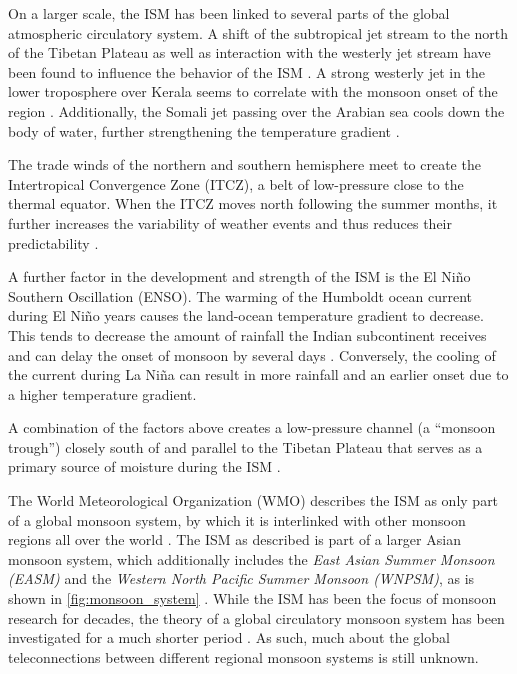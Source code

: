 On a larger scale, the ISM has been linked to several parts of the global atmospheric circulatory system. A shift of the subtropical jet stream to the north of the Tibetan Plateau as well as interaction with the westerly jet stream have been found to influence the behavior of the ISM \citep{Ordonez.2016, Stolbova.2015}. A strong westerly jet in the lower troposphere over Kerala seems to correlate with the monsoon onset of the region \citep{Ordonez.2016}. Additionally, the Somali jet passing over the Arabian sea cools down the body of water, further strengthening the temperature gradient \citep{Stolbova.2015}.

The trade winds of the northern and southern hemisphere meet to create the Intertropical Convergence Zone (ITCZ), a belt of low-pressure close to the thermal equator. When the ITCZ moves north following the summer months, it further increases the variability of weather events and thus reduces their predictability \citep{Stolbova.2015}.

A further factor in the development and strength of the ISM is the El Niño Southern Oscillation (ENSO). The warming of the Humboldt ocean current during El Niño years causes the land-ocean temperature gradient to decrease. This tends to decrease the amount of rainfall the Indian subcontinent receives and can delay the onset of monsoon by several days \citep{Pradhan.2017, Willetts.2017}. Conversely, the cooling of the current during La Niña can result in more rainfall and an earlier onset due to a higher temperature gradient.

A combination of the factors above creates a low-pressure channel (a ``monsoon trough'') closely south of and parallel to the Tibetan Plateau that serves as a primary source of moisture during the ISM \citep{Stolbova.2015}.

The World Meteorological Organization (WMO) describes the ISM as only part of a global monsoon system, by which it is interlinked with other monsoon regions all over the world \citep{WorldMeteorologicalOrganization.2005}. The ISM as described is part of a larger Asian monsoon system, which additionally includes the \textit{East Asian Summer Monsoon (EASM)} and the \textit{Western North Pacific Summer Monsoon (WNPSM)}, as is shown in \cref{fig:monsoon_system} \citep{Yihui.2005}. While the ISM has been the focus of monsoon research for decades, the theory of a global circulatory monsoon system has been investigated for a much shorter period \citep{WorldMeteorologicalOrganization.2005}. As such, much about the global teleconnections between different regional monsoon systems is still unknown.

